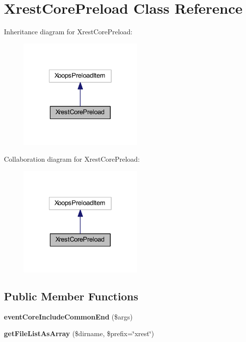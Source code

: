 \hypertarget{class_xrest_core_preload}{\section{Xrest\-Core\-Preload Class Reference}
\label{class_xrest_core_preload}
}


Inheritance diagram for Xrest\-Core\-Preload\-:
\nopagebreak
\begin{figure}[H]
\begin{center}
\leavevmode
\includegraphics[width=174pt]{class_xrest_core_preload__inherit__graph}
\end{center}
\end{figure}


Collaboration diagram for Xrest\-Core\-Preload\-:
\nopagebreak
\begin{figure}[H]
\begin{center}
\leavevmode
\includegraphics[width=174pt]{class_xrest_core_preload__coll__graph}
\end{center}
\end{figure}
\subsection*{Public Member Functions}
\begin{DoxyCompactItemize}
\item 
\hypertarget{class_xrest_core_preload_af8c197de09add249b14503f6a03434d1}{{\bfseries event\-Core\-Include\-Common\-End} (\$args)}\label{class_xrest_core_preload_af8c197de09add249b14503f6a03434d1}

\item 
\hypertarget{class_xrest_core_preload_ab051dedd566a6be3fa3734afa8a002ef}{{\bfseries get\-File\-List\-As\-Array} (\$dirname, \$prefix=\char`\"{}xrest\char`\"{})}\label{class_xrest_core_preload_ab051dedd566a6be3fa3734afa8a002ef}

\end{DoxyCompactItemize}


